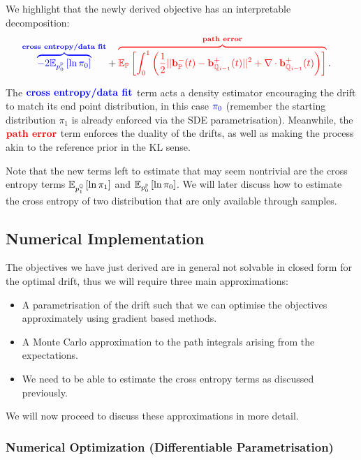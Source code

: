 \documentclass[a4paper,12pt,twoside,openright]{report}
\makeatletter
\theoremstyle{definition}
\def\mathcolor#1#{\@mathcolor{#1}}
\def\@mathcolor#1#2#3{%
  \protect\leavevmode
  \begingroup
    \color#1{#2}#3%
  \endgroup
}
\makeatother
\begin{document}
We highlight that the newly derived objective has an interpretable  decomposition:
\begin{align*}
 \mathcolor{blue}{\overbrace{-2\E_{p^{\P}_0}\left[\log \pi_0 \right]}^{\textbf{cross entropy/data fit}}} &+ \mathcolor{red}{\overbrace{\E_{\P}\left[\int_0^1 \left(\frac{1}{2}||\rvb_\P^{-}(t) - \rvb_{\Q_{i-1}}^{+}(t)||^2 + \nabla\cdot\rvb^{+}_{\Q_{i-1}}(t) \right)\right] }^{\textbf{path error}}}.
\end{align*}

The $\mathcolor{blue}{\textbf{cross entropy/data fit}}$ term acts a density estimator encouraging the drift to match its end point distribution, in this case $\mathcolor{blue}{\pi_0}$ (remember the starting distribution $\pi_1$ is already enforced via the SDE parametrisation). Meanwhile, the $\mathcolor{red}{\textbf{path error}}$ term enforces the duality of the drifts, as well as making the process akin to the reference prior in the KL sense.

Note that the new terms left to estimate that may seem nontrivial are the cross entropy terms $\mathbb{E}_{p^{{\mathbb{Q}}}_1}\left[\operatorname{ln} \pi_1 \right]$ and $\mathbb{E}_{p^{{\mathbb{P}}}_0}\left[\operatorname{ln} \pi_0 \right]$. We will later discuss how to estimate the cross entropy of two distribution that are only available through samples. 

\subsection{Numerical Implementation}

The objectives we have just derived are in general not solvable in closed form for the optimal drift, thus we will require three main approximations:
\begin{itemize}
    \item A parametrisation of the drift such that we can optimise the objectives approximately using gradient based methods.
    \item A Monte Carlo approximation to the path integrals arising from the expectations.
    \item We need to be able to estimate the cross entropy terms as discussed previously.
\end{itemize}

We will now proceed to discuss these approximations in more detail.
\subsubsection{Numerical Optimization (Differentiable Parametrisation)}
\end{document}
